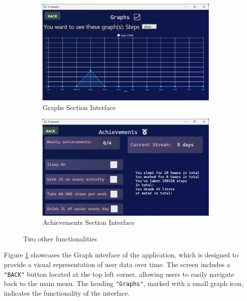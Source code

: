 \documentclass[12pt]{article}
\begin{document}
\begin{figure}[!ht]
  \centering
  \begin{subfigure}{0.4\linewidth}
    \includegraphics[width=\linewidth]{Graphs Screen}
    \caption{Graphs Section Interface}
    \label{fig:Graphs}
  \end{subfigure}
  \hfill
  \begin{subfigure}{0.4\linewidth}
    \includegraphics[width=\linewidth]{Achievements Screen}
    \caption{Achievements Section Interface}
    \label{fig:Achievements}
  \end{subfigure}
  \caption{Two other functionalities}
  \label{fig:subfunc}
\end{figure}

Figure \ref{fig:Graphs} showcases the Graph interface of the application, which is
designed to provide a visual representation of user data over time. The screen 
includes a \texttt{"BACK"} button located at the top left corner, allowing users to easily
navigate back to the main menu. The heading \texttt{"Graphs"}, marked with a small graph icon,
indicates the functionality of the interface.\par
\end{document}
